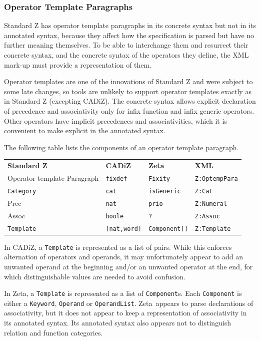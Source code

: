\documentclass{llncs}  %
\newcommand{\AFont}[1]{\texttt{#1}}
\newcommand{\CADiZ}{CADiZ}
\newcommand{\Zeta}{Zeta}
\newcommand{\AParagraph}{Paragraph}
\newcommand{\CPrec}{Prec}
\newcommand{\CAssoc}{Assoc}
\begin{document}
\subsubsection{Operator Template Paragraphs}

Standard Z has operator template paragraphs in its concrete syntax
but not in its annotated syntax,
because they affect how the specification is parsed
but have no further meaning themselves.
To be able to interchange them and resurrect their concrete syntax,
and the concrete syntax of the operators they define,
the XML mark-up must provide a representation of them.

Operator templates are one of the innovations of Standard Z
and were subject to some late changes,
so tools are unlikely to support operator templates exactly as in Standard Z
(excepting \CADiZ).
The concrete syntax allows explicit declaration of precedence and associativity
only for infix function and infix generic operators.
Other operators have implicit precedences and associativities,
which it is convenient to make explicit in the annotated syntax.

The following table lists the components of an operator template paragraph.

\begin{center}
\begin{tabular}{|l|l|l|l|}
\hline
{\bf Standard Z} & {\bf \CADiZ} & {\bf \Zeta} & {\bf XML}\\
Operator template \AParagraph & \AFont{fixdef} & \AFont{Fixity} & \AFont{Z:OptempPara}\\
\hline
\AFont{Category} & \AFont{cat} & \AFont{isGeneric} & \AFont{Z:Cat}\\
\CPrec & \AFont{nat} & \AFont{prio} & \AFont{Z:Numeral}\\
\CAssoc & \AFont{boole} & \AFont{?} & \AFont{Z:Assoc}\\
\AFont{Template} & \AFont{[nat,word]} & \AFont{Component[]} & \AFont{Z:Template}\\
\hline
\end{tabular}
\end{center}

In \CADiZ, a \AFont{Template} is represented as a list of pairs.
While this enforces alternation of operators and operands,
it may unfortunately appear to add an unwanted operand at the beginning
and/or an unwanted operator at the end,
for which distinguishable values are needed to avoid confusion.

In \Zeta, a \AFont{Template} is represented as a list of \AFont{Component}s.
Each \AFont{Component} is either a \AFont{Keyword}, \AFont{Operand} or
\AFont{OperandList}.
\Zeta\ appears to parse declarations of associativity,
but it does not appear to keep a representation of associativity
in its annotated syntax.
Its annotated syntax also appears not to distinguish
relation and function categories.
\end{document}
